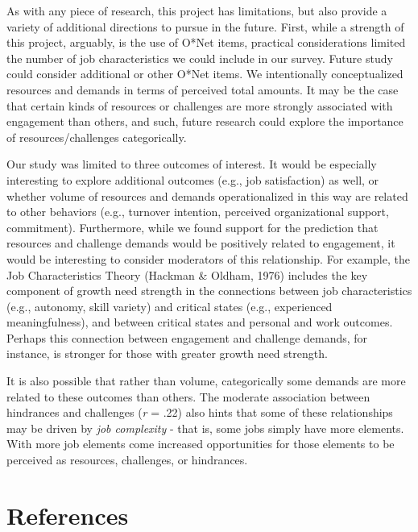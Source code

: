 \documentclass[
  man]{apa6}
\begin{document}
As with any piece of research, this project has limitations, but also provide a variety of additional directions to pursue in the future. First, while a strength of this project, arguably, is the use of O*Net items, practical considerations limited the number of job characteristics we could include in our survey. Future study could consider additional or other O*Net items. We intentionally conceptualized resources and demands in terms of perceived total amounts. It may be the case that certain kinds of resources or challenges are more strongly associated with engagement than others, and such, future research could explore the importance of resources/challenges categorically.

Our study was limited to three outcomes of interest. It would be especially interesting to explore additional outcomes (e.g., job satisfaction) as well, or whether volume of resources and demands operationalized in this way are related to other behaviors (e.g., turnover intention, perceived organizational support, commitment). Furthermore, while we found support for the prediction that resources and challenge demands would be positively related to engagement, it would be interesting to consider moderators of this relationship. For example, the Job Characteristics Theory (Hackman \& Oldham, 1976) includes the key component of growth need strength in the connections between job characteristics (e.g., autonomy, skill variety) and critical states (e.g., experienced meaningfulness), and between critical states and personal and work outcomes. Perhaps this connection between engagement and challenge demands, for instance, is stronger for those with greater growth need strength.

It is also possible that rather than volume, categorically some demands are more related to these outcomes than others. The moderate association between hindrances and challenges (\emph{r} = .22) also hints that some of these relationships may be driven by \emph{job complexity} - that is, some jobs simply have more elements. With more job elements come increased opportunities for those elements to be perceived as resources, challenges, or hindrances.
\newpage

\hypertarget{references}{%
\section{References}\label{references}}

\begingroup
\setlength{\parindent}{-0.5in}
\setlength{\leftskip}{0.5in}
\end{document}
